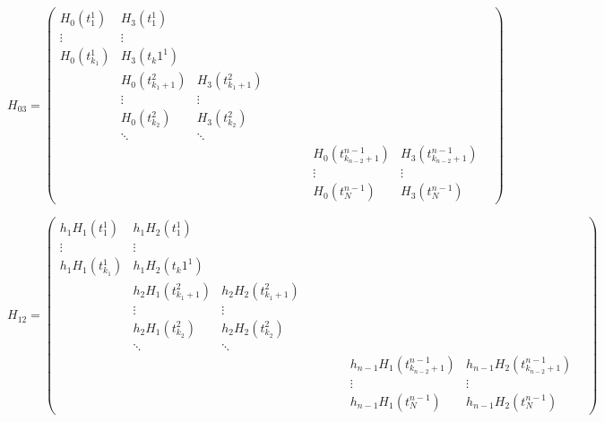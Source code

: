 \documentclass[a4paper,12pt]{article} %
\begin{document}
                
                 $$H_{03}=\begin{pmatrix} H_0(t_1^1)&H_3(t_1^1)& & & & & & & &  \\ \vdots&\vdots& & & & & & &  \\ H_0(t_{k_1}^1)&H_3(t_k1^1)& & & & & & & \\ &H_0(t_{{k_1}+1}^2)&H_3(t_{{k_1}+1}^2)& & & & & &   \\ &\vdots&\vdots& & & & & &  \\ &H_0(t_{k_2}^2)&H_3(t_{k_2}^2)& & & & & & \\ &\ddots&\ddots & & & & & & & \\ & & & & & & &H_0(t_{{k_{n-2}}+1}^{n-1}) &H_3(t_{{k_{n-2}}+1}^{n-1})\\ & & & & & & &\vdots &\vdots\\ & & & & & & &H_0(t_N^{n-1}) &H_3(t_N^{n-1}) \end{pmatrix}$$
                
                
                $$H_{12}=\begin{pmatrix} h_1H_1(t_1^1)&h_1H_2(t_1^1)& & & & & & & &  \\ \vdots&\vdots& & & & & & &  \\ h_1H_1(t_{k_1}^1)&h_1H_2(t_k1^1)& & & & & & & \\ &h_2H_1(t_{{k_1}+1}^2)&h_2H_2(t_{{k_1}+1}^2)& & & & & &   \\ &\vdots&\vdots& & & & & &  \\ &h_2H_1(t_{k_2}^2)&h_2H_2(t_{k_2}^2)& & & & & & \\ &\ddots&\ddots & & & & & & & \\ & & & & & & &h_{n-1}H_1(t_{{k_{n-2}}+1}^{n-1}) &h_{n-1}H_2(t_{{k_{n-2}}+1}^{n-1})\\ & & & & & & &\vdots &\vdots\\ & & & & & & &h_{n-1}H_1(t_N^{n-1}) &h_{n-1}H_2(t_N^{n-1}) \end{pmatrix}$$
                


    	
\begin{figure}
\begin{center}
\end{center}
\end{figure}
\end{document}
